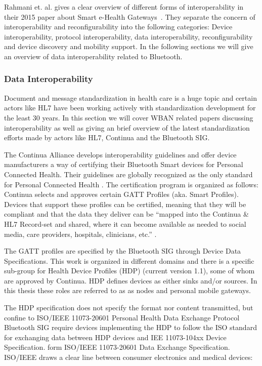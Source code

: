 Rahmani et. al. gives a clear overview of different forms of interoperability in their 2015 paper about Smart e-Health Gateways~\cite{DrAmirMohammadRahmani:2014vx}. They separate the concern of interoperability and reconfigurability into the following categories: Device interoperability, protocol interoperability, data interoperability, reconfigurability and device discovery and mobility support. In the following sections we will give an overview of data interoperability related to Bluetooth.

\subsubsection{Data Interoperability} %
\label{ssub:data_interoperability}


Document and message standardization in health care is a huge topic and certain actors like HL7 have been working actively with standardization development for the least 30 years. In this section we will cover WBAN related papers discussing interoperability as well as giving an brief overview of the latest standardization efforts made by actors like HL7, Continua and the Bluetooth SIG.

The Continua Alliance develops interoperability guidelines and offer device manufacturers a way of certifying their Bluetooth Smart devices for Personal Connected Health. Their guidelines are globally recognized as the only standard for Personal Connected Health \cite{newRef:27}. The certification program is organized as follows: Continua selects and approves certain GATT Profiles (aka. Smart Profiles). Devices that support these profiles can be certified, meaning that they will be compliant and that the data they deliver can be ``mapped into the Continua & HL7 Record-set and shared, where it can become available as needed to social media, care providers, hospitals, clinicians, etc.'' \cite{newRef:27}.

The GATT profiles are specified by the Bluetooth SIG through Device Data Specifications. This work is organized in different domains and there is a specific sub-group for Health Device Profiles (HDP) (current version 1.1), some of whom are approved by Continua. HDP defines devices as either sinks and/or sources. In this thesis these roles are referred to as as nodes and personal mobile gateways.

The HDP specification does not specify the format nor content transmitted, but confine to ISO/IEEE 11073-20601 Personal Health Data Exchange Protocol \cite{newRef:18} Bluetooth SIG require devices implementing the HDP to follow the ISO standard for exchanging data between HDP devices and IEE 11073-104xx Device Specification. form ISO/IEEE 11073-20601 Data Exchange Specification. ISO/IEEE draws a clear line between consumer electronics and medical devices: 

